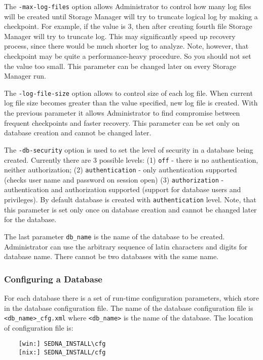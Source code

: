 \documentclass[a4paper,12pt]{article}
\begin{document}
The \verb!-max-log-files! option allows Administrator to control how many log files will be created until Storage Manager will try
to truncate logical log by making a checkpoint. For example, if the value is $3$, then after creating fourth file Storage Manager will try to truncate log. This may significantly speed up recovery process, since there would be much shorter log to analyze. Note, however, that checkpoint may be quite a performance-heavy procedure. So you should not set the value too small. This parameter can be changed later on every Storage Manager run.

The \verb!-log-file-size! option allows to control size of each log file. When current log file size becomes greater than the value specified, new log file is created. With the previous parameter it allows Administrator to find compromise between frequent checkpoints and faster recovery. This parameter can be set only on database creation and cannot be changed later.

The \verb!-db-security! option is used to set the level of security in a database being created. Currently there are 3 possible levels: (1) \verb!off! - there is no authentication, neither authorization; (2) \verb!authentication! - only authentication supported (checks user name and password on session open) (3) \verb!authorization! - authentication and authorization supported (support for database users and privileges). By default database is created with \verb!authentication! level. Note, that this parameter is set only once on database creation and cannot be changed later for the database.

The last parameter \verb!db_name! is the name of the database to be created. Administrator can use the arbitrary sequence of latin characters and digits for database name. There  cannot be two databases with the same name.

\subsubsection{Configuring a Database}
\label{ConfigDB}
For each database there is a set of run-time configuration parameters, which store in the database configuration file. The name of the database configuration file is \verb!<db_name>_cfg.xml! where \verb!<db_name>! is the name of the database. The location of configuration file is:
\begin{verbatim}
	[win:] SEDNA_INSTALL\cfg
	[nix:] SEDNA_INSTALL/cfg
\end{verbatim}
\end{document}
